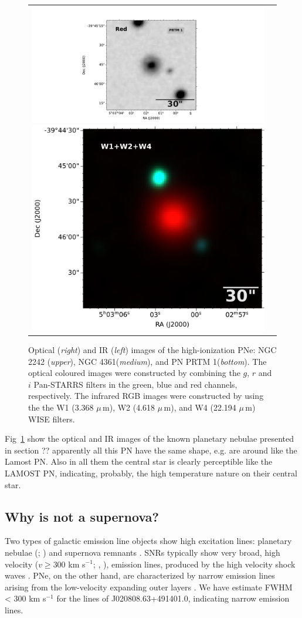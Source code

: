 \documentclass[fleqn,usenatbib]{mnras}
\begin{document}
\begin{figure}
\begin{tabular}{l l}
\includegraphics[width=0.535\linewidth, trim=280 10 330 10, clip]{Figs/dss_search_red.pdf}
\includegraphics[width=0.47\linewidth, trim=58 0 0 0]{Figs/0754m394_ac51-w4-int-3_ra75.75721626934_dec-39.76236833917_asec150.000-421-RGB.pdf}\\

\end{tabular}  
  \caption{Optical (\textit{right}) and IR (\textit{left}) images of the 
    high-ionization PNe: NGC 2242 (\textit{upper}),  NGC 4361(\textit{medium}), and
    PN PRTM 1(\textit{bottom}).
    The optical coloured images were constructed by combining the
    $g$, $r$ and $i$ Pan-STARRS filters in the green, blue and red channels, respectively.
    The infrared RGB images were constructed by using the the W1 (3.368 $\mu$\,m), W2 (4.618 $\mu$\,m),
    and W4 (22.194 $\mu$\,m) WISE filters.} 
  \label{fig:images-known}
\end{figure}

Fig~\ref{fig:images-known} show the optical and IR images of the known planetary nebulae
presented in section ?? apparently all this PN have the same shape, e.g. are around like
the Lamost PN. Also in all them the central star is clearly perceptible like the LAMOST PN,
indicating, probably, the high temperature nature on their central star.

\subsection{Why is not a supernova?}
\label{sec:snr}

Two types of galactic emission line objects show high excitation
lines: planetary nebulae (\citealp{Bernard:2009}; \citealp{Guiles:2007})
and supernova remnants \citep{Sandstrom:2009, Ghavamian:2009}.
SNRs typically show very broad, high velocity ($v \geq 300$ km s$^{-1}$;
\citealp{Oliveira:2011}, \citealp{Fesen:2010}), emission lines,  produced by the
high velocity shock waves \citep{Fesen:1985, Fesen:1996, Stupar:2007}. 
PNe, on the other hand, are characterized by narrow emission lines
arising from the low-velocity expanding outer layers \citep{Balick:2002, Gorny:2009}.
We have estimate FWHM < 300 km s$^{-1}$ for the lines of J020808.63+491401.0, indicating
narrow emission lines.
\end{document}

